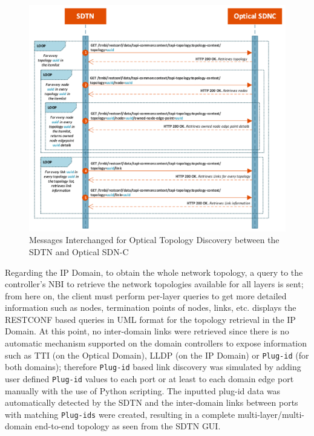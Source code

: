 \documentclass[a4paper,fleqn]{cas-dc}
\begin{document}
\begin{figure}
	\centering
		\includegraphics[width=\linewidth]{figs/optical_topology_workflow_2.png}
	\caption{Messages Interchanged for Optical Topology Discovery between the SDTN and Optical SDN-C}
	\label{FIG:optical_topology_workflow}
\end{figure}

Regarding the IP Domain, to obtain the whole network topology, a query to the controller’s NBI to retrieve the network topologies available for all layers is sent; from here on, the client must perform per-layer queries to get more detailed information such as nodes, termination points of nodes, links, etc.  displays the RESTCONF based queries in UML format for the topology retrieval in the IP Domain. 
At this point, no inter-domain links were retrieved since there is no automatic mechanism supported on the domain controllers to expose information such as TTI (on the Optical Domain), LLDP (on the IP Domain) or \texttt{Plug-id} (for both domains); therefore \texttt{Plug-id} based link discovery was simulated by adding user defined \texttt{Plug-id} values to each port or at least to each domain edge port manually with the use of Python scripting. The inputted plug-id data was automatically detected by the SDTN and the inter-domain links between ports with matching \texttt{Plug-ids} were created, resulting in a complete multi-layer/multi-domain end-to-end topology as seen from the SDTN GUI.
\end{document}

